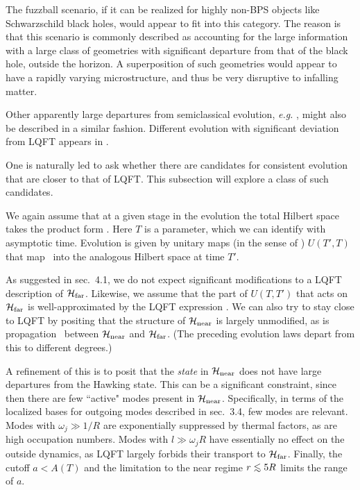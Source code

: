 The fuzzball scenario, if it can be realized for highly non-BPS objects like Schwarzschild black holes, would appear to fit into this category.  The reason is that this scenario is commonly described as accounting for the large information with a large class of geometries with significant departure from that of the black hole, outside the horizon.  A superposition of such geometries would appear to have a rapidly varying microstructure, and thus be very disruptive to infalling matter.

Other apparently large departures from semiclassical evolution, {\it e.g.} \tHooftAA, might also be described in a similar fashion. Different evolution with significant deviation from LQFT appears in \Rozali.


One is naturally led to ask whether there are candidates for consistent evolution that are closer to that of LQFT.  This subsection will explore a class of such candidates.

We again assume that at a given stage in the evolution the total Hilbert space takes the product form \bnfdecomp.  Here $T$ is a parameter, which we can identify with asymptotic time.  Evolution is given by unitary maps (in the sense of \transf) $U(T',T)$ that map \bnfdecomp\ into the analogous Hilbert space at time $T'$.


As suggested in sec.~4.1, we do not expect significant modifications to a LQFT description of ${{\cal H}_{\rm far}}$.  Likewise, we assume that the part of $U(T,T')$ that acts on ${{\cal H}_{\rm far}}$ is well-approximated by the LQFT expression \unitop.  We can also try to stay close to LQFT by positing that the structure of ${{\cal H}_{\rm near}}$ is largely unmodified, as is propagation \unitop\ between ${{\cal H}_{\rm near}}$ and ${{\cal H}_{\rm far}}$.  (The preceding evolution laws depart from this to different degrees.)    

A refinement of this is to posit that the {\it state} in ${{\cal H}_{\rm near}}$ does not have large departures from the Hawking state.
This can be a significant constraint, since then there are few ``active" modes present in ${{\cal H}_{\rm near}}$.  Specifically, in terms of the localized bases for outgoing modes described in sec.~3.4, few modes are relevant.  Modes with $\omega_j\gg 1/R$ are exponentially suppressed by thermal factors, as are high occupation numbers.  Modes with $l\gg \omega_j R$ have essentially no effect on the outside dynamics, as LQFT largely forbids their transport to ${{\cal H}_{\rm far}}$.  Finally, the cutoff $a<A(T)$ and the limitation to the near regime $r\roughly<5R$ limits the range of $a$.

